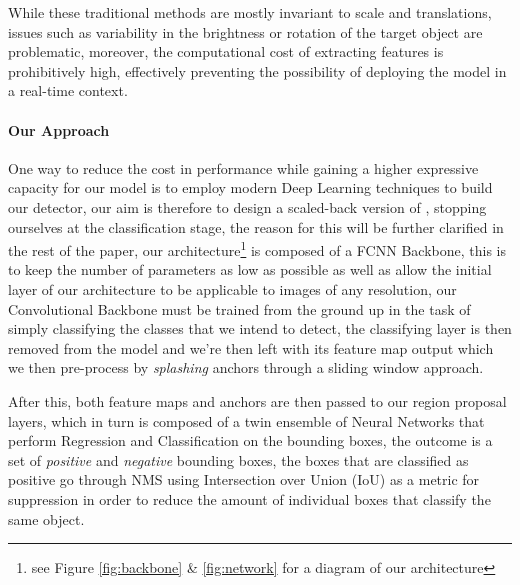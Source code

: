 \documentclass[10pt,journal,cspaper,compsoc]{IEEEtran}
\begin{document}
    While these traditional methods are mostly invariant to scale and translations, issues such as 
    variability in the brightness or rotation of the target object are problematic, moreover, the 
    computational cost of extracting features is prohibitively high, effectively preventing the possibility
    of deploying the model in a real-time context.

    \paragraph*{Our Approach}
    One way to reduce the cost in performance while gaining a higher expressive capacity for our model is to employ
    modern Deep Learning techniques to build our detector, our aim is therefore to 
    design a scaled-back version of \cite{arxiv:FasterRCNN}, stopping ourselves at the classification stage,
    the reason for this will be further clarified in the rest of the paper, our architecture\footnote{see 
    Figure \ref{fig:backbone} \& \ref{fig:network} for a diagram
    of our architecture} is composed of a FCNN\cite{Chen:FCNN,Simonyan:VCC16} Backbone, this is to keep the number 
    of parameters as low as possible as well as allow the initial layer of our architecture to be applicable to images 
    of any resolution, our Convolutional Backbone must be trained from the ground up in the task of simply classifying 
    the classes that we intend to detect, the classifying layer is then removed from the model and we're then
    left with its feature map output which we then pre-process by \emph{splashing} anchors through a sliding window 
    approach.

    After this, both feature maps and anchors are then passed to our region proposal layers, which in turn is composed 
    of a twin ensemble of Neural Networks that perform Regression and Classification on the bounding boxes, the outcome is a set of 
    \emph{positive} and \emph{negative} bounding boxes, the boxes that are classified as positive 
    go through NMS\cite{Neubeck:NMS} using Intersection over Union (IoU) \cite{Rezatofighi:IoU} as a metric for suppression
    in order to reduce the amount of individual boxes that classify the same object.
\end{document}
